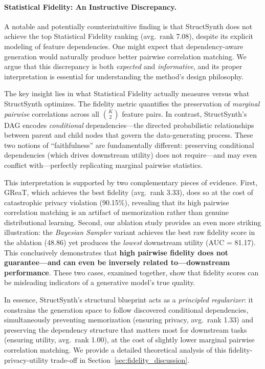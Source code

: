 \paragraph{Statistical Fidelity: An Instructive Discrepancy.}
A notable and potentially counterintuitive finding is that \textsf{StructSynth} does not achieve the top Statistical Fidelity ranking (avg.\ rank 7.08), despite its explicit modeling of feature dependencies. One might expect that dependency-aware generation would naturally produce better pairwise correlation matching. We argue that this discrepancy is both \emph{expected} and \emph{informative}, and its proper interpretation is essential for understanding the method's design philosophy.

The key insight lies in what Statistical Fidelity actually measures versus what \textsf{StructSynth} optimizes. The fidelity metric quantifies the preservation of \emph{marginal pairwise} correlations across all $\binom{K}{2}$ feature pairs. In contrast, \textsf{StructSynth}'s DAG encodes \emph{conditional} dependencies---the directed probabilistic relationships between parent and child nodes that govern the data-generating process. These two notions of ``faithfulness'' are fundamentally different: preserving conditional dependencies (which drives downstream utility) does not require---and may even conflict with---perfectly replicating marginal pairwise statistics.

This interpretation is supported by two complementary pieces of evidence. First, GReaT, which achieves the best fidelity (avg.\ rank 3.33), does so at the cost of catastrophic privacy violation (90.15\%), revealing that its high pairwise correlation matching is an artifact of memorization rather than genuine distributional learning. Second, our ablation study provides an even more striking illustration: the \textit{Bayesian Sampler} variant achieves the best raw fidelity score in the ablation (48.86) yet produces the \emph{lowest} downstream utility (AUC = 81.17). This conclusively demonstrates that \textbf{high pairwise fidelity does not guarantee---and can even be inversely related to---downstream performance}. These two cases, examined together, show that fidelity scores can be misleading indicators of a generative model's true quality.

In essence, \textsf{StructSynth}'s structural blueprint acts as a \emph{principled regularizer}: it constrains the generation space to follow discovered conditional dependencies, simultaneously preventing memorization (ensuring privacy, avg.\ rank 1.33) and preserving the dependency structure that matters most for downstream tasks (ensuring utility, avg.\ rank 1.00), at the cost of slightly lower marginal pairwise correlation matching. We provide a detailed theoretical analysis of this fidelity-privacy-utility trade-off in Section~\ref{sec:fidelity_discussion}.



